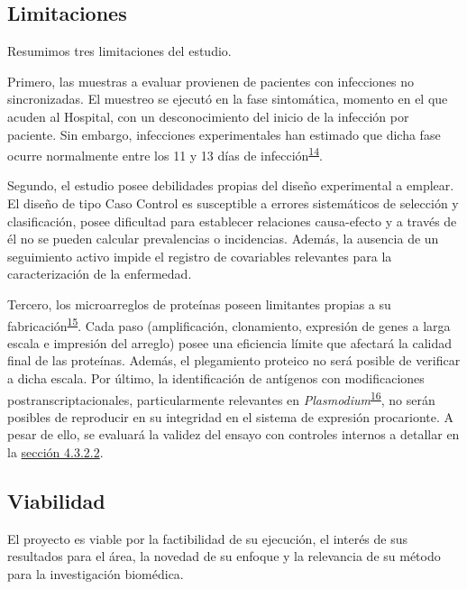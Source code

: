 \documentclass[a4paper]{article}
\begin{document}
\subsection{Limitaciones}\label{limit}

Resumimos tres limitaciones del estudio.

Primero, las muestras a evaluar provienen de pacientes con infecciones
no sincronizadas. El muestreo se ejecutó en la fase sintomática, momento
en el que acuden al Hospital, con un desconocimiento del inicio de la
infección por paciente. Sin embargo, infecciones experimentales han
estimado que dicha fase ocurre normalmente entre los 11 y 13 días de
infección\textsuperscript{\protect\hyperlink{ref-arevalo2014}{14}}.

Segundo, el estudio posee debilidades propias del diseño experimental a
emplear. El diseño de tipo Caso Control es susceptible a errores
sistemáticos de selección y clasificación, posee dificultad para
establecer relaciones causa-efecto y a través de él no se pueden
calcular prevalencias o incidencias. Además, la ausencia de un
seguimiento activo impide el registro de covariables relevantes para la
caracterización de la enfermedad.

Tercero, los microarreglos de proteínas poseen limitantes propias a su
fabricación\textsuperscript{\protect\hyperlink{ref-vigil2010}{15}}. Cada
paso (amplificación, clonamiento, expresión de genes a larga escala e
impresión del arreglo) posee una eficiencia límite que afectará la
calidad final de las proteínas. Además, el plegamiento proteico no será
posible de verificar a dicha escala. Por último, la identificación de
antígenos con modificaciones postranscriptacionales, particularmente
relevantes en
\emph{Plasmodium}\textsuperscript{\protect\hyperlink{ref-leroch2009postmod}{16}},
no serán posibles de reproducir en su integridad en el sistema de
expresión procarionte. A pesar de ello, se evaluará la validez del
ensayo con controles internos a detallar en la
\protect\hyperlink{validez}{sección 4.3.2.2}.

\subsection{Viabilidad}\label{viabilidad}

El proyecto es viable por la factibilidad de su ejecución, el interés de
sus resultados para el área, la novedad de su enfoque y la relevancia de
su método para la investigación biomédica.
\end{document}
